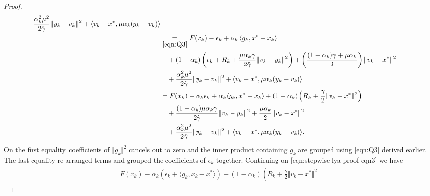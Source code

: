 \documentclass[12pt]{article}
\begin{document}
\begin{proof}
\begin{align}
\begin{split}
                + \frac{\alpha_k^2 \mu^2}{2\hat \gamma}\Vert y_k - v_k\Vert^2
                + \langle v_k - x^*, \mu\alpha_k(y_k - v_k)\rangle
            \\
            &\underset{\eqref{eqn:Q3}}{=} 
            F(x_k) - \epsilon_k 
            + \alpha_k\left\langle 
                g_k, 
                x^* - x_k
            \right\rangle
            \\
            &\quad 
                + (1 - \alpha_k)
                \left(
                    \epsilon_k + R_k + 
                    \frac{\mu\alpha_k\gamma}{2\hat \gamma}
                    \Vert v_k - y_k\Vert^2
                \right)
                + 
                \left(
                \frac{(1 - \alpha_k)\gamma + \mu \alpha_k}{2} 
                \right)\Vert v_k - x^*\Vert^2
            \\
            & \quad 
                + \frac{\alpha_k^2 \mu^2}{2\hat \gamma}\Vert y_k - v_k\Vert^2
                + \langle v_k - x^*, \mu\alpha_k(y_k - v_k)\rangle
            \\
            &= 
            F(x_k) - \alpha_k\epsilon_k + \alpha_k\langle g_k, x^* - x_k\rangle
            + 
            (1 - \alpha_k)\left(
                R_k + \frac{\gamma}{2}\Vert v_k - x^*\Vert^2
            \right)
            \\&\quad 
                + \frac{(1 - \alpha_k)\mu\alpha_k\gamma}{2\hat \gamma}\Vert v_k - y_k\Vert^2
                + \frac{\mu \alpha_k}{2}\Vert v_k - x^*\Vert^2
            \\&\quad 
                + \frac{\alpha_k^2 \mu^2}{2\hat\gamma}\Vert y_k - v_k\Vert^2
                + \langle v_k - x^*, \mu\alpha_k(y_k - v_k)\rangle.     
        \end{split}
        \end{align}
        On the first equality, coefficients of $\Vert g_k\Vert^2$ cancels out to zero and the inner product containing $g_k$ are grouped
        using \eqref{eqn:Q3} derived earlier. 
        The last equality re-arranged terms and grouped the coefficients of $\epsilon_k$ together. 
        Continuing on \eqref{eqn:stepwise-lya-proof-eqn3} we have
        \begin{align}\label{eqn:stepwise-lya-proof-eqn3.1}
        \begin{split}
            &
            F(x_k) - \alpha_k(\epsilon_k + \langle g_k, x_k - x^*\rangle)
            + 
            (1 - \alpha_k)\left(
                R_k + \frac{\gamma}{2}\Vert v_k - x^*\Vert^2

\end{split}
\end{align}
\end{proof}
\end{document}
